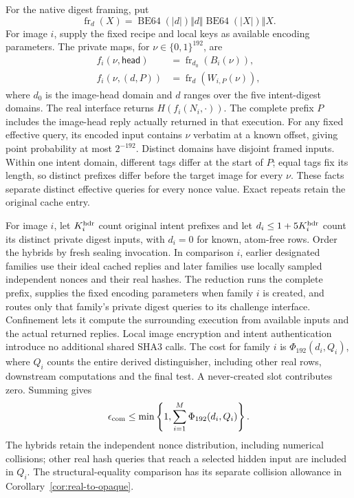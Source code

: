 For the native digest framing, put
\[
 \operatorname{fr}_d(X)=
 \operatorname{BE64}(|d|)\Vert d\Vert
 \operatorname{BE64}(|X|)\Vert X.
\]
For image $i$, supply the fixed recipe and local keys as available encoding
parameters. The private maps, for $\nu\in\{0,1\}^{192}$, are
\[
 \begin{split}
  f_i(\nu,\mathsf{head})&=\operatorname{fr}_{d_0}(B_i(\nu)),\\
  f_i(\nu,(d,P))&=\operatorname{fr}_{d}(W_{i,P}(\nu)),
 \end{split}
\]
where $d_0$ is the image-head domain and $d$ ranges over the five
intent-digest domains. The real interface returns
$H(f_i(N_i,\cdot))$. The complete prefix $P$ includes the image-head
reply actually returned in that execution. For any fixed effective query,
its encoded input contains $\nu$ verbatim at a known offset, giving point
probability at most $2^{-192}$. Distinct domains have disjoint framed
inputs. Within one intent domain, different tags differ at the start of
$P$; equal tags fix its length, so distinct prefixes differ before the
target image for every $\nu$. These facts separate distinct effective
queries for every nonce value. Exact repeats retain the original cache entry.

For image $i$, let $K_i^{\rm hdr}$ count original intent prefixes and let
$d_i\le1+5K_i^{\rm hdr}$ count its distinct private digest inputs, with
$d_i=0$ for known, atom-free rows. Order the hybrids by fresh sealing
invocation. In comparison $i$, earlier designated families use their ideal cached
replies and later families use locally sampled independent nonces and
their real hashes. The reduction runs the complete prefix, supplies the
fixed encoding parameters when family $i$ is created, and routes only that
family's private digest queries to its challenge interface. Confinement
lets it compute the surrounding execution from available inputs and the
actual returned replies. Local image encryption and intent authentication
introduce no additional shared SHA3 calls. The cost for family $i$ is
$\Phi_{192}(d_i,Q_i)$, where $Q_i$ counts the entire derived distinguisher,
including other real rows, downstream computations and the final test.
A never-created slot contributes zero. Summing gives
\[
 \epsilon_{\rm com}
 \le\min\left\{1,\sum_{i=1}^{M}\Phi_{192}(d_i,Q_i)\right\}.
\]
The hybrids retain the independent nonce distribution, including numerical
collisions; other real hash queries that reach a selected hidden input are
included in $Q_i$. The structural-equality comparison has its separate
collision allowance in Corollary~\ref{cor:real-to-opaque}.

